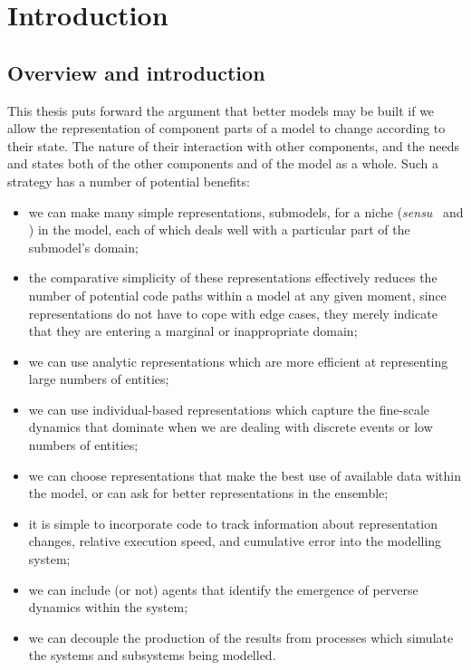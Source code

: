 \titlepg
\signaturepage
\altcopyrightpage
\abswithesis
\ackpage
{}



\chapter[INTRODUCTION]{Introduction}\label{intro}

\section{Overview and introduction}

This thesis puts forward the argument that better models may be built
if we allow the representation of component parts of a model to change
according to their state. The nature of their interaction with other components, and the needs
and states both of the other components and of the model as a whole. Such
a strategy has a number of potential benefits:
\begin{itemize}
\item we can make many simple representations, submodels, for a niche
         (\emph{sensu}~\cite{Gray06:1} and \cite{Gray2014}) in the
        model, each of which deals well with a particular part of the
        submodel's domain;
\item the comparative simplicity of these representations effectively 
      reduces the number of potential code paths within a model at any
      given moment, since representations do not have to cope with
      edge cases, they merely indicate that they are entering a marginal
      or inappropriate domain;
\item we can use analytic representations which are more efficient at
      representing large numbers of entities;
\item we can use individual-based representations which capture
      the fine-scale dynamics that dominate when we are dealing with
      discrete events or low numbers of entities;
\item we can choose representations that make the best use of available
      data within the model, or can ask for better representations
      in the ensemble;
\item it is simple to incorporate code to track information about
      representation changes, relative execution speed, and cumulative
      error into the modelling system;
\item we can include (or not) agents that identify the emergence of 
      perverse dynamics within the system;
\item we can decouple the production of the results from processes
      which simulate the systems and subsystems being modelled.
\end{itemize}

